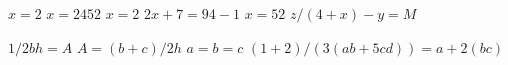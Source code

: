 \documentclass{article}
\begin{document}
$x = 2$
$x=2452$ 
$ x = 2 $ 
$2x + 7 = 94 - 1$ 
$x = 52$ 
$z/(4 + x) - y = M$

$1/2bh = A$
$A = (b+c)/2h$
$a=b=c$
$(1+2)/(3(ab+5cd))=a+2(bc)$
\end{document}
